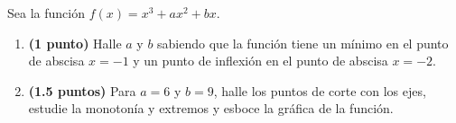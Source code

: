 
Sea la función $f(x)=x^3+ax^2+bx$.
\begin{enumerate}[label=\alph*)]
\item \textbf{(1 punto)} Halle $a$ y $b$ sabiendo que la función tiene un mínimo en el punto de abscisa $x=-1$ y un punto de inflexión en el punto de abscisa $x=-2$.
\item \textbf{(1.5 puntos)} Para $a=6$ y $b=9$, halle los puntos de corte con los ejes, estudie la monotonía y extremos y esboce la gráfica de la función.
\end{enumerate}
